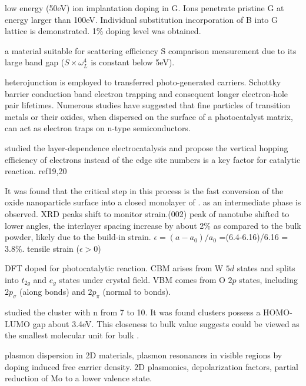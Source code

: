 low energy (50eV) ion implantation doping in G. Ions penetrate pristine G at energy larger than 100eV. Individual substitution incorporation of B into G lattice is demonstrated. 1\% doping level was obtained. \cite{Bangert2013}

 a material suitable for scattering efficiency S comparison measurement due to its large band gap ($S\times \omega_L^4$ is constant below 5eV).

heterojunction is employed to transferred photo-generated carriers. Schottky barrier conduction band electron trapping and consequent longer electron-hole pair lifetimes. Numerous studies have suggested that fine particles of transition metals or their oxides, when dispersed on the surface of a photocatalyst matrix, can act as electron traps on n-type semiconductors.\cite{Zhou2010} 

\citeauthor{Cao2014} studied the layer-dependence  electrocatalysis and propose the vertical hopping efficiency of electrons instead of the edge site numbers is a key factor for catalytic reaction.\cite{Cao2014} ref19,20

It was found that the critical step in this process is the fast conversion of the oxide nanoparticle surface into a closed monolayer of .  as an intermediate phase is observed. XRD peaks shift to monitor strain.(002) peak of nanotube shifted to lower angles, the interlayer spacing increase by about 2\% as compared to the bulk powder, likely due to the build-in strain.\cite{ZAK2009} 
$\epsilon = (a - a_0)/a_0$ =(6.4-6.16)/6.16 = 3.8\%. tensile strain ($\epsilon > 0$)


DFT doped  for photocatalytic reaction.\cite{Wang2012} CBM arises from W $5d$ states and splits into $t_{2g}$ and $e_g$ states under crystal field. VBM comes from O $2p$ states, including $2p_\sigma$ (along  bonds) and $2p_\pi$ (normal to  bonds).



\citeauthor{Huang2006} studied the  cluster with n from 7 to 10.\cite{Huang2006} It was found  clusters possess a HOMO-LUMO gap about 3.4eV. This closeness to bulk value suggests  could be viewed as the smallest molecular unit for bulk .

plasmon dispersion in 2D materials, plasmon resonances in visible regions by doping induced free carrier density. 2D plasmonics, depolarization factors, partial reduction of Mo to a lower valence state. \cite{Alsaif2014a}

